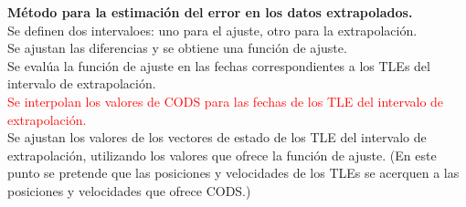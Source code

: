 {\bf{M\'etodo para la estimaci\'on del error en los datos extrapolados.}}\\
Se definen dos intervaloes: uno para el ajuste, otro para la extrapolaci\'on.\\
Se ajustan las diferencias y se obtiene una funci\'on de ajuste.\\
Se eval\'ua la funci\'on de ajuste en las fechas correspondientes a los TLEs del intervalo de extrapolaci\'on.\\
{\textcolor{red}{Se interpolan los valores de CODS para las fechas de los TLE del intervalo de extrapolaci\'on.}}\\
Se ajustan los valores de los vectores de estado de los TLE del intervalo de extrapolaci\'on, utilizando los valores que ofrece la funci\'on de ajuste. (En este punto se pretende que las posiciones y velocidades de los TLEs se acerquen a las posiciones y velocidades que ofrece CODS.)\\

